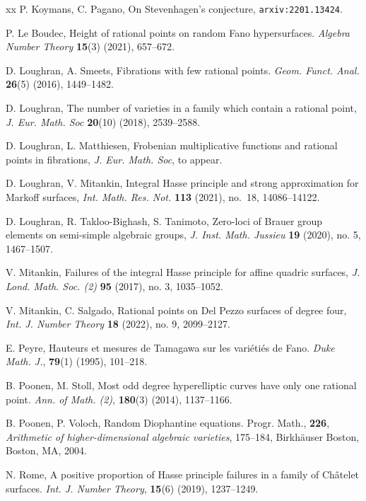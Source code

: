 \documentclass[a4paper,12pt,reqno]{amsart}
\numberwithin{equation}{section} \numberwithin{figure}{section}
\renewcommand{\#}{\sharp}
\theoremstyle{definition}
\numberwithin{lemma}{section}
\begin{document}
\begin{thebibliography}{xx}
{P. Koymans, C. Pagano},
On Stevenhagen's conjecture, \texttt{arxiv:2201.13424}.

{P. Le Boudec}, 
{Height of rational points on random {F}ano hypersurfaces}.
\emph{Algebra Number Theory} {\bf 15}(3) (2021), 657--672.

{D. Loughran, A. Smeets}, 
{Fibrations with few rational points}.
\emph{Geom. Funct. Anal.} {\bf 26}(5) (2016), 1449--1482.

{D. Loughran},
The number of varieties in a family which contain a rational point,
\emph{J. Eur. Math. Soc} {\bf20}(10) (2018), 2539--2588.

{D. Loughran, L. Matthiesen},
 Frobenian multiplicative functions and rational points in fibrations,
\emph{J. Eur. Math. Soc}, to appear.

D. Loughran, V. Mitankin,
Integral {H}asse principle and strong approximation for
              {M}arkoff surfaces, 
\emph{Int. Math. Res. Not.} \textbf{113} (2021), no.~18, 14086--14122.
   
D. Loughran, R. Takloo-Bighash, S. Tanimoto,
Zero-loci of Brauer group elements on semi-simple algebraic groups,
\emph{J. Inst. Math. Jussieu} {\bf19} (2020), no. 5, 1467--1507.

V. Mitankin,
Failures of the integral {H}asse principle for affine quadric surfaces,
\emph{J. Lond. Math. Soc. (2)} {\bf 95} (2017), no. 3, 1035--1052.
  
V. Mitankin, C. Salgado,
Rational points on {D}el {P}ezzo surfaces of degree four,
\emph{Int. J. Number Theory} {\bf 18} (2022), no. 9, 2099--2127.
 
{E. Peyre}, 
{Hauteurs et mesures de Tamagawa sur les vari\'{e}ti\'{e}s de Fano}.
\emph{Duke Math. J.}, {\bf79}(1) (1995), 101--218.

{B. Poonen, M. Stoll}, 
{Most odd degree hyperelliptic curves have only one rational point}.
\emph{Ann. of Math. (2)}, {\bf 180}(3) (2014), 1137--1166.

{B. Poonen, P. Voloch}, {Random Diophantine equations}.
Progr. Math., {\bf226}, \emph{Arithmetic of higher-dimensional algebraic varieties},
175--184, Birkh\"{a}user Boston, Boston, MA, 2004.

{N. Rome}, 
{A positive proportion of {H}asse principle failures in a family of {C}h\^{a}telet surfaces}.
\emph{Int. J. Number Theory}, {\bf 15}(6) (2019), 1237--1249.


\end{thebibliography}
\end{document}
